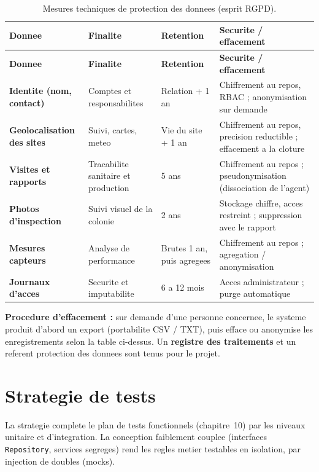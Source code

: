 {\small
\begin{longtable}{>{\bfseries}p{3.1cm} p{3.3cm} p{2.7cm} p{4.2cm}}
\caption{Mesures techniques de protection des donnees (esprit RGPD).}
\label{tab:rgpd}\\
\toprule
\textbf{Donnee} & \textbf{Finalite} & \textbf{Retention} & \textbf{Securite / effacement} \\
\midrule
\endfirsthead
\toprule
\textbf{Donnee} & \textbf{Finalite} & \textbf{Retention} & \textbf{Securite / effacement} \\
\midrule
\endhead
Identite (nom, contact) & Comptes et responsabilites & Relation + 1 an & Chiffrement au repos, RBAC ; anonymisation sur demande \\
Geolocalisation des sites & Suivi, cartes, meteo & Vie du site + 1 an & Chiffrement au repos, precision reductible ; effacement a la cloture \\
Visites et rapports & Tracabilite sanitaire et production & 5 ans & Chiffrement au repos ; pseudonymisation (dissociation de l'agent) \\
Photos d'inspection & Suivi visuel de la colonie & 2 ans & Stockage chiffre, acces restreint ; suppression avec le rapport \\
Mesures capteurs & Analyse de performance & Brutes 1 an, puis agregees & Chiffrement au repos ; agregation / anonymisation \\
Journaux d'acces & Securite et imputabilite & 6 a 12 mois & Acces administrateur ; purge automatique \\
\bottomrule
\end{longtable}}

\begin{encadre}
\textbf{Procedure d'effacement :} sur demande d'une personne concernee, le
systeme produit d'abord un export (portabilite CSV / TXT), puis efface ou
anonymise les enregistrements selon la table ci-dessus. Un \textbf{registre des
traitements} et un referent protection des donnees sont tenus pour le projet.
\end{encadre}

\section{Strategie de tests}
La strategie complete le plan de tests fonctionnels (chapitre~10) par les
niveaux unitaire et d'integration. La conception faiblement couplee (interfaces
\texttt{Repository}, services segreges) rend les regles metier testables en
isolation, par injection de doubles (mocks).

